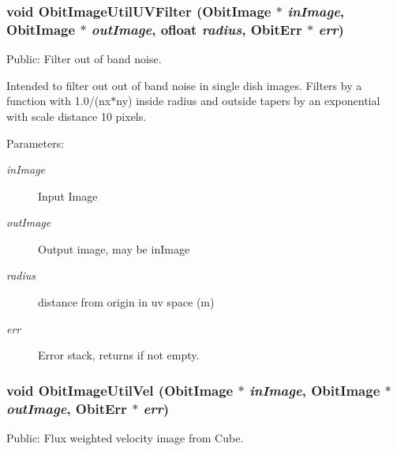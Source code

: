 \subsubsection{\setlength{\rightskip}{0pt plus 5cm}void Obit\-Image\-Util\-UVFilter ({\bf Obit\-Image} $\ast$ {\em in\-Image}, {\bf Obit\-Image} $\ast$ {\em out\-Image}, {\bf ofloat} {\em radius}, {\bf Obit\-Err} $\ast$ {\em err})}\label{ObitImageUtil_8c_a24}


Public: Filter out of band noise. 

Intended to filter out out of band noise in single dish images. Filters by a function with 1.0/(nx$\ast$ny) inside radius and outside tapers by an exponential with scale distance 10 pixels. \begin{Desc}
\item[Parameters:]
\begin{description}
\item[{\em in\-Image}]Input Image \item[{\em out\-Image}]Output image, may be in\-Image \item[{\em radius}]distance from origin in uv space (m) \item[{\em err}]Error stack, returns if not empty. \end{description}
\end{Desc}
\subsubsection{\setlength{\rightskip}{0pt plus 5cm}void Obit\-Image\-Util\-Vel ({\bf Obit\-Image} $\ast$ {\em in\-Image}, {\bf Obit\-Image} $\ast$ {\em out\-Image}, {\bf Obit\-Err} $\ast$ {\em err})}\label{ObitImageUtil_8c_a22}


Public: Flux weighted velocity image from Cube. 

